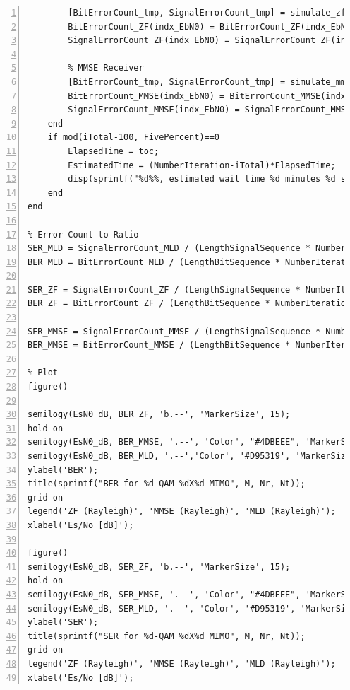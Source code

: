 \documentclass{article}
\begin{document}
\begin{lstlisting}[style=Matlab-editor, frame=single, numbers=left,]
        % ZF Receiver
        [BitErrorCount_tmp, SignalErrorCount_tmp] = simulate_zf(ReceivedSymbolSequence, SignalSequence, SignalBinary, M, H);
        BitErrorCount_ZF(indx_EbN0) = BitErrorCount_ZF(indx_EbN0) + BitErrorCount_tmp;
        SignalErrorCount_ZF(indx_EbN0) = SignalErrorCount_ZF(indx_EbN0) + SignalErrorCount_tmp;
        
        % MMSE Receiver
        [BitErrorCount_tmp, SignalErrorCount_tmp] = simulate_mmse(ReceivedSymbolSequence, SignalSequence, SignalBinary, M, H, EsN0(indx_EbN0));
        BitErrorCount_MMSE(indx_EbN0) = BitErrorCount_MMSE(indx_EbN0) + BitErrorCount_tmp;
        SignalErrorCount_MMSE(indx_EbN0) = SignalErrorCount_MMSE(indx_EbN0) + SignalErrorCount_tmp;
    end
    if mod(iTotal-100, FivePercent)==0
        ElapsedTime = toc;
        EstimatedTime = (NumberIteration-iTotal)*ElapsedTime;
        disp(sprintf("%d%%, estimated wait time %d minutes %d seconds", round(iTotal/NumberIteration*100), floor(EstimatedTime/60), floor(mod(EstimatedTime, 60))))
    end
end

% Error Count to Ratio
SER_MLD = SignalErrorCount_MLD / (LengthSignalSequence * NumberIteration);
BER_MLD = BitErrorCount_MLD / (LengthBitSequence * NumberIteration);

SER_ZF = SignalErrorCount_ZF / (LengthSignalSequence * NumberIteration);
BER_ZF = BitErrorCount_ZF / (LengthBitSequence * NumberIteration);

SER_MMSE = SignalErrorCount_MMSE / (LengthSignalSequence * NumberIteration);
BER_MMSE = BitErrorCount_MMSE / (LengthBitSequence * NumberIteration);

% Plot
figure()

semilogy(EsN0_dB, BER_ZF, 'b.--', 'MarkerSize', 15);
hold on
semilogy(EsN0_dB, BER_MMSE, '.--', 'Color', "#4DBEEE", 'MarkerSize', 15);
semilogy(EsN0_dB, BER_MLD, '.--','Color', '#D95319', 'MarkerSize', 15);
ylabel('BER');
title(sprintf("BER for %d-QAM %dX%d MIMO", M, Nr, Nt));
grid on
legend('ZF (Rayleigh)', 'MMSE (Rayleigh)', 'MLD (Rayleigh)');
xlabel('Es/No [dB]');

figure()
semilogy(EsN0_dB, SER_ZF, 'b.--', 'MarkerSize', 15);
hold on
semilogy(EsN0_dB, SER_MMSE, '.--', 'Color', "#4DBEEE", 'MarkerSize', 15); 
semilogy(EsN0_dB, SER_MLD, '.--', 'Color', '#D95319', 'MarkerSize', 15);
ylabel('SER');
title(sprintf("SER for %d-QAM %dX%d MIMO", M, Nr, Nt));
grid on
legend('ZF (Rayleigh)', 'MMSE (Rayleigh)', 'MLD (Rayleigh)');
xlabel('Es/No [dB]');
\end{lstlisting}
\vspace{0.3cm}
\end{document}
